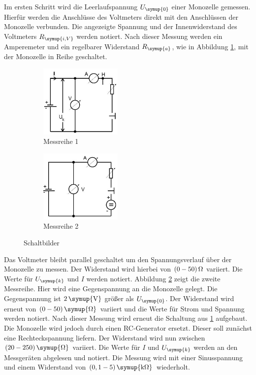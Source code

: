 Im ersten Schritt wird die Leerlaufspannung $U_\symup{0}$ einer Monozelle
gemessen. Hierfür werden die Anschlüsse des Voltmeters direkt mit den Anschlüssen
der Monozelle verbunden. Die angezeigte Spannung und der Innenwiderstand des
Voltmeters $R_\symup{i,V}$ werden notiert.
Nach dieser Messung werden ein Amperemeter und ein regelbarer Widerstand
$R_\symup{a}$, wie in Abbildung \ref{fig:schlt1}, mit der Monozelle in Reihe geschaltet.
\begin{figure}[H]
  \centering
  \begin{subfigure}{0.48\textwidth}
    \centering
    \includegraphics[width=4cm]{bilder/sinrecht.jpg}
    \caption{Messreihe 1}
    \label{fig:schlt1}
  \end{subfigure}
  \begin{subfigure}{0.48\textwidth}
    \centering
    \includegraphics[width=4cm]{bilder/gegenspannung.jpg}
    \caption{Messreihe 2}
    \label{fig:schlt2}
  \end{subfigure}
  \caption{Schaltbilder \cite{301}}
  \label{fig:schlt}
\end{figure}
Das Voltmeter bleibt parallel geschaltet um den Spannungsverlauf über der
Monozelle zu messen. Der Widerstand wird hierbei von $(0-50)\,\si{\ohm}$
variiert. Die Werte für $U_\symup{k}$ und $I$ werden notiert.
Abbildung \ref{fig:schlt2} zeigt die zweite Messreihe. Hier wird eine
Gegenspannung an die Monozelle gelegt. Die Gegenspannung ist $2\,\symup{\si{\volt}}$
größer als $U_\symup{0}$. Der Widerstand wird erneut von $(0-50)\,\symup{\si{\ohm}}$
variiert und die Werte für Strom und Spannung werden notiert.
Nach dieser Messung wird erneut die Schaltung aus \ref{fig:schlt1} aufgebaut.
Die Monozelle wird jedoch durch einen RC-Generator ersetzt. Dieser soll zunächst
eine Rechteckspannung liefern. Der Widerstand wird nun zwischen $(20-250)\,\symup{\si{\ohm}}$
variiert. Die Werte für $I$ und $U_\symup{k}$ werden an den Messgeräten
abgelesen und notiert.
Die Messung wird mit einer Sinusspannung und einem Widerstand von
$(0,1-5)\,\symup{\si{\kilo\ohm}}$ wiederholt.
\newpage
